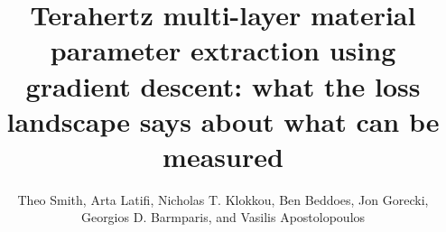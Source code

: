 \documentclass{optica-article}
\begin{document}
\title{Terahertz multi-layer material parameter extraction using gradient descent: what the loss landscape says about what can be measured}

\author{Theo Smith, Arta Latifi, Nicholas T. Klokkou, Ben Beddoes, Jon Gorecki, Georgios D. Barmparis, and Vasilis Apostolopoulos}

\address{School of Physics and Astronomy, University of Southampton, Southampton SO17 1BJ, United Kingdom\\
Royal School of Mines, Imperial College London, London SW7 2AZ, United Kingdom\\
Laser and THz Laboratory, Department of Physics, University of Crete, Heraklion 70013, Greece\\
Twenty-One Semiconductors GmbH, Neckartenzlingen, Germany\\
Optoelectronics Research Centre, University of Southampton, Southampton SO17 1BJ, United Kingdom\\
}

\end{document}

